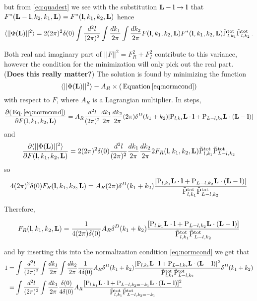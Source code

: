 \documentclass[12pt]{article}
\newcommand{\beq}{\begin{equation}}
\newcommand{\eeq}{\end{equation}}
\newcommand{\beqal}{\begin{aligned}}
\newcommand{\eeqal}{\end{aligned}}
\def\l{{\bf l}}
\def\L{{\bf L}}
\def\tot{{\rm tot}}
\def\pul{{\rm P}}
\def\ptot{{\tilde{\rm P}^{\rm tot}}}
\def\d2l{\frac{d^2l}{(2\pi)^2}}
\def\dko{\frac{dk_1}{2\pi}}
\def\dkt{\frac{dk_2}{2\pi}}
\numberwithin{equation}{section}
\begin{document}
but from \ref{eq:quadest} we see with the substitution $\L-\l
\rightarrow \l$ that $F^*(\L-\l,k_2,k_1,\L) = F^*(\l,k_1,k_2,\L)$
hence
\beq
\langle ||\Phi(\L)||^2\rangle = 2 (2\pi)^2 \delta(0) \int \d2l \int \dko \int
\dkt F(\l,k_1,k_2,\L) F^*(\l,k_1,k_2,\L) \ptot_{l,k_1}\ptot_{l,k_2} \, .  \label{eq:phisqavg}
\eeq

Both real and imaginary part of $||F||^2=F_R^2+F_I^2$ contribute
to this variance, however the condition for the
minimization will only pick out the real part. (\textbf{Does this really matter?}) The solution is found
by minimizing the function
\beq
\langle ||\Phi(\L)||^2\rangle- A_R \times (\, {\rm Equation} \, \ref{eq:normcond})
\eeq
with respect to $F$, where $A_R$ is a Lagrangian multiplier. In steps,
\beq
\frac{\partial (\, {\rm Eq.}\, \ref{eq:normcond})}{\partial F(\l,k_1,k_2,\L)} = A_R \d2l \dko \dkt
(2\pi) \delta^D(k_1+k_2) [\pul_{l,k_1} \L\cdot \l + \pul_{L-l,k_2} \L\cdot (\L-\l)]
\eeq
and
\beq
\frac{\partial \langle ||\Phi(\L)||^2 \rangle}{\partial F(\l,k_1,k_2,\L)} =
2 (2\pi)^2 \delta(0) \d2l \dko \dkt 2 F_R(\l,k_1,k_2,\L)
\ptot_{l,k_1}\ptot_{L-l,k_2}
\eeq
so
\beq
\beqal
4 (2\pi)^2 \delta(0)  F_R(\l,k_1,k_2,\L) = A_R (2\pi) \delta^D(k_1+k_2) \frac{[\pul_{l,k_1} \L\cdot \l +
	\pul_{L-l,k_2} \L\cdot (\L-\l)]}{\ptot_{l,k_1}\ptot_{L-l,k_2}}
\label{eq:expforf}
\eeqal
\eeq

Therefore,

\beq
\beqal
F_R(\l,k_1,k_2,\L) = \frac{1}{4 (2\pi) \delta(0) } A_R \delta^D(k_1+k_2) \frac{[\pul_{l,k_1} \L\cdot \l +
	\pul_{L-l,k_2} \L\cdot (\L-\l)]}{\ptot_{l,k_1}\ptot_{L-l,k_2}}
\label{eq:expforf}
\eeqal
\eeq


and by inserting this into the normalization condition
\ref{eq:normcond} we get that
\beq
\beqal
1 &= \int \d2l \int \dko \int \dkt \frac{1}{4 \delta(0) } A_R \delta^D(k_1+k_2) \frac{[\pul_{l,k_1} \L\cdot \l +
	\pul_{L-l,k_2} \L\cdot (\L-\l)]^2}{\ptot_{l,k_1}\ptot_{L-l,k_2}} \delta^D(k_1+k_2) 
\\
& = \int \d2l \int \dko \frac{\delta(0)}{4 \delta(0) } A_R \frac{[\pul_{l,k_1} \L\cdot \l +
	\pul_{L-l,k_2 = -k_1} \L\cdot (\L-\l)]^2}{\ptot_{l,k_1}\ptot_{L-l,k_2 = -k_1}} 
\eeqal
\eeq
\end{document}
